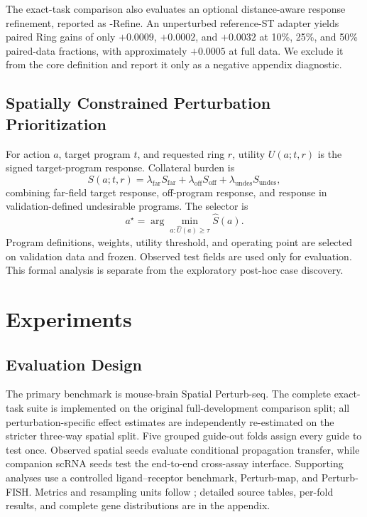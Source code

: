 The exact-task comparison also evaluates an optional distance-aware response
refinement, reported as \methodname{}-Refine. An unperturbed reference-ST
adapter yields paired Ring gains of only $+0.0009$, $+0.0002$, and $+0.0032$
at 10\%, 25\%, and 50\% paired-data fractions, with approximately $+0.0005$ at
full data. We exclude it from the core definition and report it only as a
negative appendix diagnostic.

\subsection{Spatially Constrained Perturbation Prioritization}
\label{sec:intervention_method}
For action $a$, target program $t$, and requested ring $r$, utility
$U(a;t,r)$ is the signed target-program response. Collateral burden is
\begin{equation}
S(a;t,r)=\lambda_{\mathrm{far}}S_{\mathrm{far}}
+\lambda_{\mathrm{off}}S_{\mathrm{off}}
+\lambda_{\mathrm{undes}}S_{\mathrm{undes}},
\label{eq:burden}
\end{equation}
combining far-field target response, off-program response, and response in
validation-defined undesirable programs. The selector is
\begin{equation}
a^\star=\arg\min_{a:\widehat U(a)\geq\tau}\widehat S(a).
\label{eq:selector}
\end{equation}
Program definitions, weights, utility threshold, and operating point are
selected on validation data and frozen. Observed test fields are used only for
evaluation. This formal analysis is separate from the exploratory post-hoc
case discovery.

\section{Experiments}
\label{sec:experiments}
\subsection{Evaluation Design}
The primary benchmark is mouse-brain Spatial Perturb-seq. The complete
exact-task suite is implemented on the original full-development comparison
split; all perturbation-specific effect estimates are independently
re-estimated on the stricter three-way spatial split. Five grouped guide-out
folds assign every guide to test once. Observed spatial seeds evaluate
conditional propagation transfer, while companion scRNA seeds test the
end-to-end cross-assay interface. Supporting analyses use a controlled
ligand--receptor benchmark, Perturb-map, and Perturb-FISH. Metrics and
resampling units follow ; detailed source tables,
per-fold results, and complete gene distributions are in the appendix.

